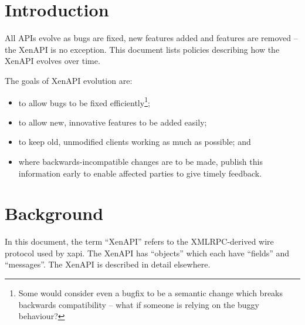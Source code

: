 \documentclass[a4paper]{article}
\begin{document}



\section{Introduction}
All APIs evolve as bugs are fixed, new features added and features are removed -- the XenAPI is no exception. This document lists policies describing how the XenAPI evolves over time.

The goals of XenAPI evolution are:
\begin{itemize}
\item to allow bugs to be fixed efficiently\footnote{Some would consider even a bugfix to be a semantic change which breaks backwards compatibility -- what if someone is relying on the buggy behaviour?};
\item to allow new, innovative features to be added easily;
\item to keep old, unmodified clients working as much as possible; and
\item where backwards-incompatible changes are to be made, publish this information early to enable affected parties to give timely feedback.
\end{itemize}

\section{Background}
In this document, the term ``XenAPI'' refers to the XMLRPC-derived wire protocol used by xapi. The XenAPI has ``objects'' which each have ``fields'' and ``messages''. The XenAPI is described in detail elsewhere.
\end{document}
